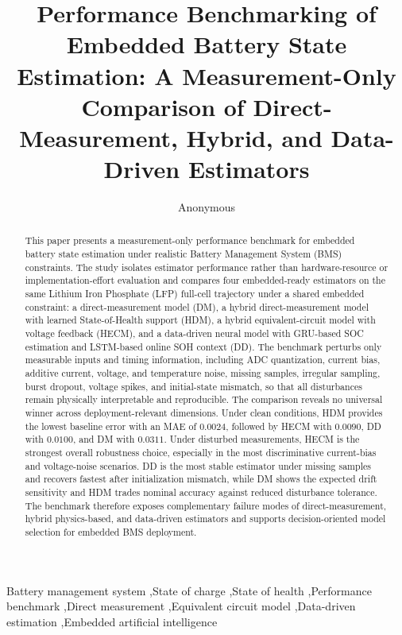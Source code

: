 \documentclass[review,nopreprintline]{elsarticle}
\date{}
\begin{document}
\begin{frontmatter}
\title{Performance Benchmarking of Embedded Battery State Estimation: A Measurement-Only Comparison of Direct-Measurement, Hybrid, and Data-Driven Estimators}
\author{Anonymous}
\begin{abstract}
This paper presents a measurement-only performance benchmark for embedded battery state estimation under realistic Battery Management System (BMS) constraints. The study isolates estimator performance rather than hardware-resource or implementation-effort evaluation and compares four embedded-ready estimators on the same Lithium Iron Phosphate (LFP) full-cell trajectory under a shared embedded constraint: a direct-measurement model (DM), a hybrid direct-measurement model with learned State-of-Health support (HDM), a hybrid equivalent-circuit model with voltage feedback (HECM), and a data-driven neural model with GRU-based SOC estimation and LSTM-based online SOH context (DD). The benchmark perturbs only measurable inputs and timing information, including ADC quantization, current bias, additive current, voltage, and temperature noise, missing samples, irregular sampling, burst dropout, voltage spikes, and initial-state mismatch, so that all disturbances remain physically interpretable and reproducible. The comparison reveals no universal winner across deployment-relevant dimensions. Under clean conditions, HDM provides the lowest baseline error with an MAE of $0.0024$, followed by HECM with $0.0090$, DD with $0.0100$, and DM with $0.0311$. Under disturbed measurements, HECM is the strongest overall robustness choice, especially in the most discriminative current-bias and voltage-noise scenarios. DD is the most stable estimator under missing samples and recovers fastest after initialization mismatch, while DM shows the expected drift sensitivity and HDM trades nominal accuracy against reduced disturbance tolerance. The benchmark therefore exposes complementary failure modes of direct-measurement, hybrid physics-based, and data-driven estimators and supports decision-oriented model selection for embedded BMS deployment.
\end{abstract}
\begin{keyword}
Battery management system \sep State of charge \sep State of health \sep Performance benchmark \sep Direct measurement \sep Equivalent circuit model \sep Data-driven estimation \sep Embedded artificial intelligence
\end{keyword}
\end{frontmatter}
\linenumbers
\end{document}
